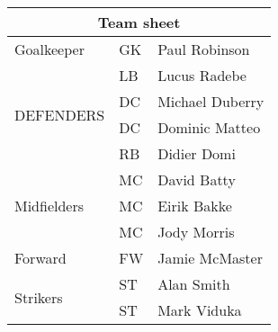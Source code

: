 \documentclass[12pt]{article}
\begin{document}
\begin{tabular}{|l|l|l|}
\hline
\multicolumn{3}{|c|}{Team sheet} \\
\hline
Goalkeeper & GK & Paul Robinson \\ \hline
\multirow{4}{*}{DEFENDERS} & LB & Lucus Radebe \\
 & DC & Michael Duberry \\
 & DC & Dominic Matteo \\
 & RB & Didier Domi \\ \hline
\multirow{3}{*}{Midfielders} & MC & David Batty \\
 & MC & Eirik Bakke \\
 & MC & Jody Morris \\ \hline
Forward & FW & Jamie McMaster \\ \hline
\multirow{2}{*}{Strikers} & ST & Alan Smith \\
 & ST & Mark Viduka \\
\hline
\end{tabular}
\end{document}
